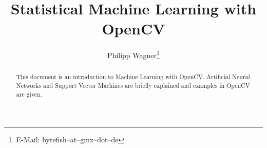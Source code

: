 \documentclass[10pt]{scrartcl}
\author{Philipp Wagner\thanks{E-Mail: bytefish--at--gmx--dot--de}}
\title{Statistical Machine Learning with OpenCV}
\begin{document}
\maketitle

\begin{abstract}
This document is an introduction to Machine Learning with OpenCV. Artificial Neural Networks and Support Vector Machines are briefly explained and examples in OpenCV are given.
\end{abstract}








\appendix



\end{document}
